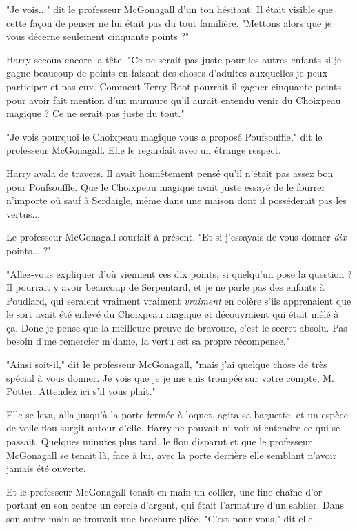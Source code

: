 "Je vois..." dit le professeur McGonagall d'un ton hésitant. Il était visible que cette façon de penser ne lui était pas du tout familière. "Mettons alors que je vous décerne seulement cinquante points ?"

Harry secoua encore la tête. "Ce ne serait pas juste pour les autres enfants si je gagne beaucoup de points en faisant des choses d'adultes auxquelles je peux participer et pas eux. Comment Terry Boot pourrait-il gagner cinquante points pour avoir fait mention d'un murmure qu'il aurait entendu venir du Choixpeau magique ? Ce ne serait pas juste du tout."

"Je vois pourquoi le Choixpeau magique vous a proposé Poufsouffle," dit le professeur McGonagall. Elle le regardait avec un étrange respect.

Harry avala de travers. Il avait honnêtement pensé qu'il n'était pas assez bon pour Poufsouffle. Que le Choixpeau magique avait juste essayé de le fourrer n'importe où sauf à Serdaigle, même dans une maison dont il posséderait pas les vertus...

Le professeur McGonagall souriait à présent. "Et si j'essayais de vous donner \emph{dix}  points... ?"

"Allez-vous expliquer d'où viennent ces dix points, si quelqu'un pose la question ? Il pourrait y avoir beaucoup de Serpentard, et je ne parle pas des enfants à Poudlard, qui seraient vraiment vraiment \emph{vraiment}  en colère s'ils apprenaient que le sort avait été enlevé du Choixpeau magique et découvraient qui était mêlé à ça. Donc je pense que la meilleure preuve de bravoure, c'est le secret absolu. Pas besoin d'me remercier m'dame, la vertu est sa propre récompense."

"Ainsi soit-il," dit le professeur McGonagall, "mais j'ai quelque chose de très spécial à vous donner. Je vois que je je me suis trompée sur votre compte, M. Potter. Attendez ici s'il vous plaît."

Elle se leva, alla jusqu'à la porte fermée à loquet, agita sa baguette, et un espèce de voile flou surgit autour d'elle. Harry ne pouvait ni voir ni entendre ce qui se passait. Quelques minutes plus tard, le flou disparut et que le professeur McGonagall se tenait là, face à lui, avec la porte derrière elle semblant n'avoir jamais été ouverte.

Et le professeur McGonagall tenait en main un collier, une fine chaîne d'or portant en son centre un cercle d'argent, qui était l'armature d'un sablier. Dans son autre main se trouvait une brochure pliée. "C'est pour vous," dit-elle.

